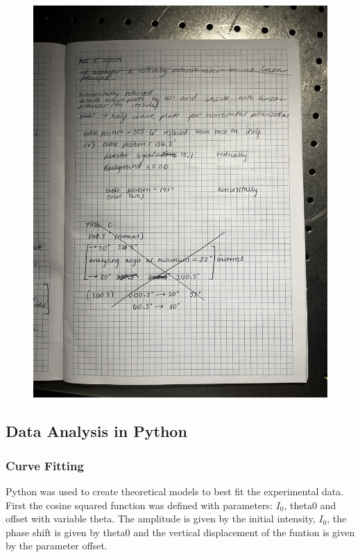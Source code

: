 \documentclass{article}
\begin{document}
\begin{figure}[H]
    \centering
    \includegraphics[width=1.2\textwidth,angle=270,origin=c]{labbook9.jpg}
\end{figure}

\subsection{Data Analysis in Python}
\subsubsection{Curve Fitting}

Python was used to create theoretical models to best fit the 
experimental data. First the cosine squared function was defined 
with parameters: $I_0$, theta0 and offset with variable theta. The 
amplitude is given by the initial intensity, $I_0$, the phase shift 
is given by theta0 and the vertical displacement of the funtion 
is given by the parameter offset.
\end{document}
